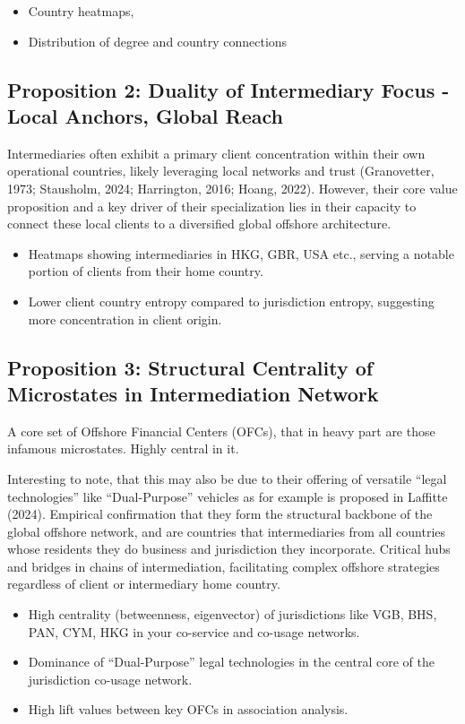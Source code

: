 \begin{itemize}
\item Country heatmaps,
\item Distribution of degree and country connections
\end{itemize}

\subsection{Proposition 2: Duality of Intermediary Focus - Local Anchors, Global Reach}

        Intermediaries often exhibit a primary client concentration within their own operational countries, likely leveraging local networks and trust (Granovetter, 1973; Stausholm, 2024; Harrington, 2016; Hoang, 2022). However, their core value proposition and a key driver of their specialization lies in their capacity to connect these local clients to a diversified global offshore architecture.
\begin{itemize}
\item Heatmaps showing intermediaries in HKG, GBR, USA etc., serving a notable portion of clients from their home country.
\item Lower client country entropy compared to jurisdiction entropy, suggesting more concentration in client origin.
\end{itemize}

\subsection{Proposition 3: Structural Centrality of Microstates in Intermediation Network}
A core set of Offshore Financial Centers (OFCs), that in heavy part are those infamous microstates. Highly central in it.

        Interesting to note, that this may also be due to their offering of versatile ``legal technologies'' like ``Dual-Purpose'' vehicles as for example is proposed in Laffitte (2024). Empirical confirmation that they form the structural backbone of the global offshore network, and are countries that intermediaries from all countries whose residents they do business and jurisdiction they incorporate. Critical hubs and bridges in chains of intermediation, facilitating complex offshore strategies regardless of client or intermediary home country.
\begin{itemize}
\item High centrality (betweenness, eigenvector) of jurisdictions like VGB, BHS, PAN, CYM, HKG in your co-service and co-usage networks.
\item Dominance of ``Dual-Purpose'' legal technologies in the central core of the jurisdiction co-usage network.
\item High lift values between key OFCs in association analysis.
\end{itemize}

